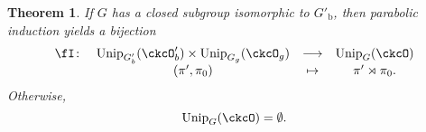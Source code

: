 \documentclass[12pt,a4paper]{amsart}
\newcommand{\oO}{\operatorname{O}}
\newcommand{\R}{\mathbb R}
\numberwithin{equation}{section}
\newtheorem{thm}{Theorem}[section]
\theoremstyle{remark}
\def\Unip{\mathrm{Unip}}
\def\Gpb{G'_{\mathrm b}}
\def\Gg{G_{\mathrm g}}
\begin{document}

\begin{thm}\label{reduction}
 If  $G$ has a closed subgroup isomorphic to $\Gpb$, then parabolic induction yields
   a bijection
  \begin{equation}\label{eq:IND}
    \begin{array}{rccc}
      \fI\colon &   \Unip_{G'_{b}}(\ckcO'_{b})\times \Unip_{G_{g}}(\ckcO_{g})&         \longrightarrow &\Unip_{G}(\ckcO) \\
                &   (\pi',\pi_{0}) & \mapsto & \pi'\rtimes \pi_{0}.
    \end{array}
  \end{equation}
  Otherwise,
  \[
    \Unip_{G}(\ckcO)=\emptyset.
  \]
\end{thm}
\end{document}
